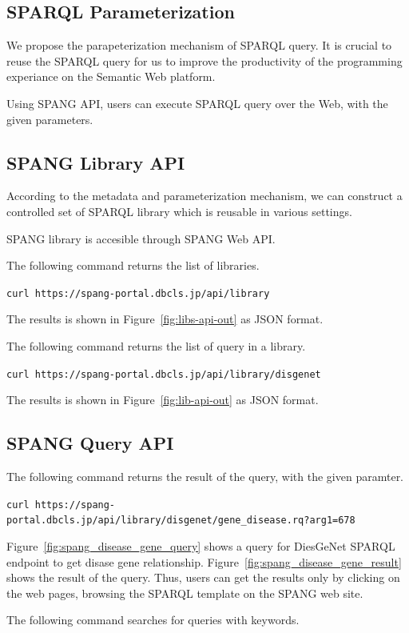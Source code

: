 \documentclass[runningheads]{llncs}
\begin{document}
\subsection{SPARQL Parameterization}

We propose the parapeterization mechanism of SPARQL query. It is crucial to reuse the SPARQL query for us to improve the productivity of the programming experiance on the Semantic Web platform.

Using SPANG API, users can execute SPARQL query over the Web, with the given parameters.


\subsection{SPANG Library API}
According to the metadata and parameterization mechanism, we can construct a controlled set of SPARQL library which is reusable in various settings.

SPANG library is accesible through SPANG Web API.

The following command returns the list of libraries.

\texttt{curl https://spang-portal.dbcls.jp/api/library}

The results is shown in Figure~\ref{fig:libs-api-out} as JSON format.


The following command returns the list of query in a library.

\texttt{curl https://spang-portal.dbcls.jp/api/library/disgenet}

The results is shown in Figure~\ref{fig:lib-api-out} as JSON format.

\subsection{SPANG Query API}

The following command returns the result of the query, with the given paramter.

\texttt{curl https://spang-portal.dbcls.jp/api/library/disgenet/gene\_disease.rq?arg1=678}



Figure~\ref{fig:spang_disease_gene_query} shows a query for DiesGeNet SPARQL endpoint to get disase gene relationship. 
Figure~\ref{fig:spang_disease_gene_result} shows the result of the query. Thus, users can get the results only by clicking on the web pages, browsing the SPARQL template on the SPANG web site.


The following command searches for queries with keywords.
\end{document}
